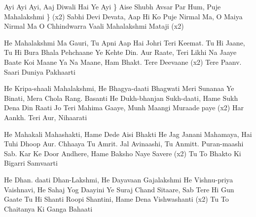 \chordsoff

    \beginchorus
        Ayi Ayi Ayi, Aaj Diwali Hai Ye Ayi \}
        Aise Shubh Avsar Par Hum, Puje Mahalakshmi \} (x2)
        Sabhi Devi Devata, Aap Hi Ko Puje
        Nirmal Ma, O Maiya Nirmal Ma
        O Chhindwarra Vaali Mahalakshmi Mataji (x2)
    \endchorus

    \beginverse
        He Mahalakshmi Ma Gauri, Tu Apni Aap Hai Johri
        Teri Keemat. Tu Hi Jaane, Tu Hi Bura Bhala Pehchaane
        Ye Kehte Din. Aur Raate, Teri Likhi Na Jaaye Baate
        Koi Maane Ya Na Maane, Ham Bhakt. Tere Deevaane (x2)
        Tere Paanv. Saari Duniya Pakhaarti
    \endverse

    \beginverse
        He Kripa-shaali Mahalakshmi, He Bhagya-daati Bhagwati
        Meri Sunanaa Ye Binati, Mera Chola Rang. Basanti
        He Dukh-bhanjan Sukh-daati, Hame Sukh Dena Din Raati
        Jo Teri Mahima Gaaye, Munh Maangi Muraade paye (x2)
        Har Aankh. Teri Aur, Nihaarati
    \endverse

    \beginverse
        He Mahakali Mahashakti, Hame Dede Aisi Bhakti
        He Jag Janani Mahamaya, Hai Tuhi Dhoop Aur. Chhaaya
        Tu Amrit. Jal Avinaashi, Tu Anmitt. Puran-maashi
        Sab. Kar Ke Door Andhere, Hame Baksho Naye Savere (x2)
        Tu To Bhakto Ki Bigarri Samvaarti
    \endverse

    \beginverse
        He Dhan. daati Dhan-Lakshmi, He Dayavaan Gajalakshmi
        He Vishnu-priya Vaishnavi, He Sahaj Yog Daayini
        Ye Suraj Chand Sitaare, Sab Tere Hi Gun Gaate
        Tu Hi Shanti Roopi Shantini, Hame Dena Vishwashanti (x2)
        Tu To Chaitanya Ki Ganga Bahaati
    \endverse
\endsong

\newpage